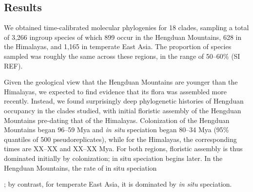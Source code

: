 \subsection{Results}

We obtained time-calibrated molecular phylogenies for 18 clades, sampling a total of 3,266 ingroup species of which 899 occur in the Hengduan Mountains, 628 in the Himalayas, and 1,165 in temperate East Asia. The proportion of species sampled was roughly the same across these regions, in the range of 50--60\% (SI REF).

Given the geological view that the Hengduan Mountains are younger than the Himalayas, we expected to find evidence that its flora was assembled more recently. Instead, we found surprisingly deep phylogenetic histories of Hengduan occupancy in the clades studied, with initial floristic assembly of the Hengduan Mountains pre-dating that of the Himalayas. Colonization of the Hengduan Mountains began 96--59 Mya and \textit{in situ} speciation began 80--34 Mya (95\% quantiles of 500 pseudoreplicates), while for the Himalayas, the corresponding times are XX--XX and XX--XX Mya. For both regions, floristic assembly is thus dominated initially by colonization; in situ speciation begins later. In the Hengduan Mountains, the rate of in situ speciation 

; by contrast, for temperate East Asia, it is dominated by \textit{in situ} speciation. 